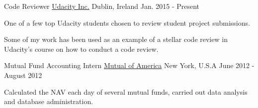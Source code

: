 \begin{cventries}
  
 
    
  \cventry
    {Code Reviewer}
    {\href{https://www.udacity.com/}{Udacity Inc.}}
    {Dublin, Ireland}
    {Jan. 2015 - Present}
    {
      \begin{cvitems}
        \item {One of a few top Udacity students chosen to review student project submissions.}
        \item {Some of my work has been used as an example of a stellar code review in Udacity's course on how to conduct a code review.}
      \end{cvitems}
    }
  \cventry
    {Mutual Fund Accounting Intern}
    {\href{https://www.mutualofamerica.com/}{Mutual of America}}
    {New York, U.S.A}
    {June 2012 - August 2012}
    {
      \begin{cvitems}
        \item {Calculated the NAV each day of several mutual funds, carried out data analysis and database administration.}
      \end{cvitems}
    }
    
  
 
\end{cventries}


